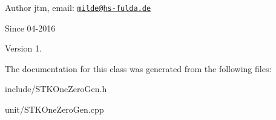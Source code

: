\begin{DoxyAuthor}{Author}
jtm, email\-:  \href{mailto:milde@hs-fulda.de}{\tt milde@hs-\/fulda.\-de} 
\end{DoxyAuthor}
\begin{DoxySince}{Since}
04-\/2016 
\end{DoxySince}
\begin{DoxyVersion}{Version}
1. 
\end{DoxyVersion}


The documentation for this class was generated from the following files\-:\begin{DoxyCompactItemize}
\item 
include/S\-T\-K\-One\-Zero\-Gen.\-h\item 
unit/S\-T\-K\-One\-Zero\-Gen.\-cpp\end{DoxyCompactItemize}
